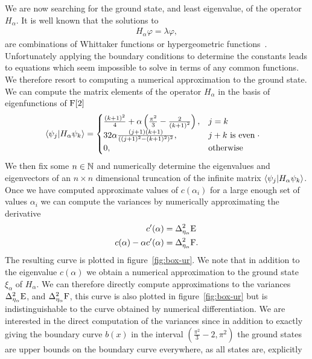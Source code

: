 We are now searching for the ground state, and least eigenvalue, of the operator $H_\alpha$. It is well known that the solutions to
\begin{align}
  H_\alpha\varphi = \lambda \varphi,
\end{align}
are combinations of Whittaker functions or hypergeometric functions~\cites{Abramowitz-and-Stegun}{Whittaker-and-Watson}. Unfortunately applying the boundary conditions to determine the constants leads to equations which seem impossible to solve in terms of any common functions. We therefore resort to computing a numerical approximation to the ground state. We can compute the matrix elements of the operator $H_\alpha$ in the basis of eigenfunctions of $\operatorname{F}[2]$
\begin{align}
  \langle \psi_j|H_\alpha \psi_k\rangle &= \begin{cases}\frac{(k+1)^2}{4} + \alpha\left(\frac{\pi^2}{3} - \frac{2}{\left(k+1\right)^2}\right), & j=k\\ 32\alpha\frac{(j + 1)(k + 1)}{((j+1)^2-(k+1)^2)^2}, &j+k\text{ is even}\\0, &\text{otherwise} \end{cases}.
\end{align}
We then fix some $n\in\mathbb{N}$ and numerically determine the eigenvalues and eigenvectors of an $n\times n$ dimensional truncation of the infinite matrix $\langle \psi_j|H_\alpha \psi_k\rangle$. Once we have computed approximate values of $c(\alpha_i)$ for a large enough set of values $\alpha_i$ we can compute the variances by numerically approximating the derivative
\begin{align}
  c^\prime(\alpha) &= \var[\eta_\alpha]{\ope}\\
  c(\alpha) - \alpha c^\prime(\alpha) &= \var[\eta_\alpha]{\opf}.
\end{align}
The resulting curve is plotted in figure~\ref{fig:box-ur}. We note that in addition to the eigenvalue $c(\alpha)$ we obtain a numerical approximation to the ground state $\xi_\alpha$ of $H_\alpha$. We can therefore directly compute approximations to the variances $\var[\eta_\alpha]{\ope}$, and $\var[\eta_\alpha]{\opf}$, this curve is also plotted in figure~\ref{fig:box-ur} but is indistinguishable to the curve obtained by numerical differentiation. We are interested in the direct computation of the variances since in addition to exactly giving the boundary curve $b(x)$ in the interval $\left(\frac{\pi^2}{3} -2, \pi^2\right)$ the ground states are upper bounds on the boundary curve everywhere, as all states are, explicitly

